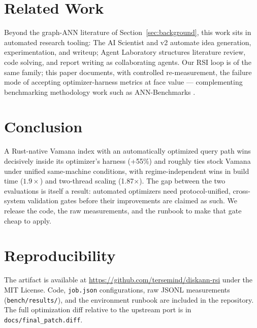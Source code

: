 \documentclass[11pt]{article}
\begin{document}
\section{Related Work}
\label{sec:related}
Beyond the graph-ANN literature of Section~\ref{sec:background}, this work
sits in automated research tooling: The AI Scientist
\cite{lu2024aiscientist} and v2 \cite{yamada2025aiscientistv2} automate idea
generation, experimentation, and writeup; Agent Laboratory
\cite{schmidgall2025agentlab} structures literature review, code solving,
and report writing as collaborating agents. Our RSI loop is of the same
family; this paper documents, with controlled re-measurement, the failure
mode of accepting optimizer-harness metrics at face value --- complementing
benchmarking methodology work such as ANN-Benchmarks
\cite{aumuller2020annbenchmarks}.

\section{Conclusion}
A Rust-native Vamana index with an automatically optimized query path wins
decisively inside its optimizer's harness (+55\%) and roughly ties stock
Vamana under unified same-machine conditions, with regime-independent wins
in build time ($1.9\times$) and two-thread scaling (1.87$\times$). The gap
between the two evaluations is itself a result: automated optimizers need
protocol-unified, cross-system validation gates before their improvements
are claimed as such. We release the code, the raw measurements, and the
runbook to make that gate cheap to apply.

\section*{Reproducibility}
The artifact is available at \url{https://github.com/tersemind/diskann-rsi}
under the MIT License. Code, \texttt{job.json} configurations, raw JSONL measurements
(\texttt{bench/results/}), and the environment runbook are included in the
repository. The full optimization diff relative to the upstream port is in
\texttt{docs/final\_patch.diff}.
\end{document}
